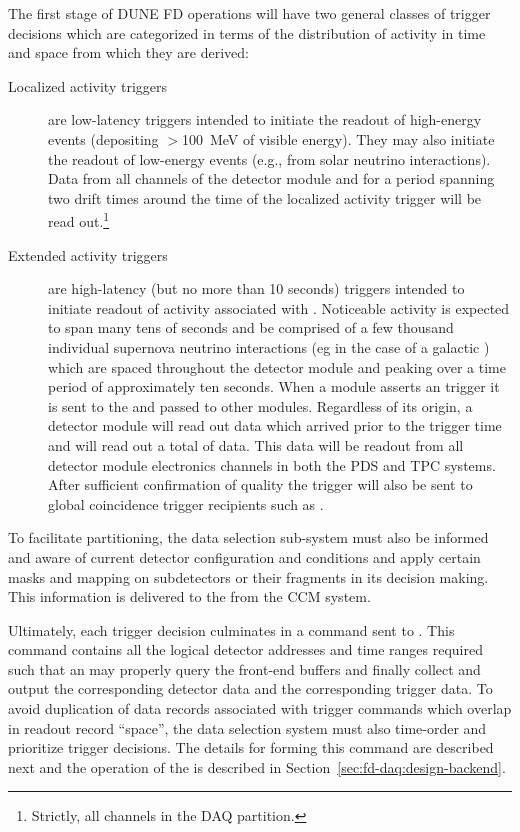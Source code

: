 The first stage of DUNE FD operations will have two general classes of trigger
decisions which are categorized in terms of the distribution of activity
in time and space from which they are derived:
\begin{description}
\item[Localized activity triggers] are low-latency triggers intended to
  initiate the readout of high-energy events (depositing $>$100~MeV of
  visible energy). 
  They may also initiate the readout of low-energy events (e.g., from
  solar neutrino interactions).
  Data from all channels of the detector module and for a period
  spanning two drift times around the time of the localized activity
  trigger will be read out.\footnote{Strictly, all channels in the DAQ partition.}
\item[Extended activity triggers] are high-latency
  (but no more than 10 seconds) triggers intended to initiate readout of
  activity associated with . 
  Noticeable  activity is expected to span many tens of
  seconds and be comprised of a few thousand individual supernova
  neutrino interactions (eg in the case of a galactic ) which
  are spaced throughout the detector module and peaking over a time
  period of approximately ten seconds.
  When a module asserts an  trigger it is sent to the
   and passed to other modules. 
  Regardless of its origin, a detector module will read out data which
  arrived \snbpretime prior to the trigger time and will read out a
  total of \snbtime data. 
  This data will be readout from all detector module electronics
  channels in both the PDS and TPC systems. 
  After sufficient confirmation of quality the  trigger will
  also be sent to global coincidence trigger recipients such as
  .
\end{description}

To facilitate partitioning, the data selection sub-system must also be
informed and aware of current detector configuration and conditions and
apply certain masks and mapping on subdetectors or their fragments in
its decision making. This information is delivered to the
 from the CCM system.

Ultimately, each trigger decision culminates in a command sent to . 
This command contains all the logical detector addresses and time ranges
required such that an  may properly query the front-end
buffers and finally collect and output the corresponding detector data
and the corresponding trigger data. To avoid duplication of data
records associated with trigger commands which overlap in readout
record ``space'', the data selection system must also time-order and
prioritize trigger decisions. The details for forming this
command are described next and the operation of the  is
described in Section~\ref{sec:fd-daq:design-backend}.

